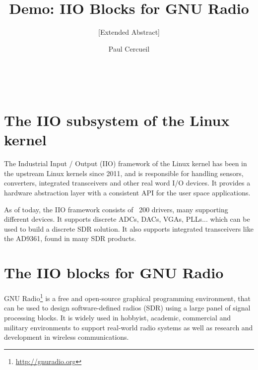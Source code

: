 \documentclass{acm_proc_article-sp}
\begin{document}
\title{Demo: IIO Blocks for GNU Radio}
\subtitle{[Extended Abstract]}


\author{
\alignauthor
Paul Cercueil\\
	\\
	\\
	\\
}

\maketitle



\section{The IIO subsystem of the Linux kernel}

The Industrial Input / Output (IIO) framework of the Linux kernel has been in
the upstream Linux kernels since 2011, and is responsible for handling sensors,
converters, integrated transceivers and other real word I/O devices. It provides
a hardware abstraction layer with a consistent API for the user space
applications.

As of today, the IIO framework consists of ~200 drivers, many supporting
different devices. It supports discrete ADCs, DACs, VGAs, PLLs... which
can be used to build a discrete SDR solution. It also supports integrated
transceivers like the AD9361, found in many SDR products.

\section{The IIO blocks for GNU Radio}

GNU Radio\footnote{\url{http://gnuradio.org}}
is a free and open-source graphical programming environment, that can
be used to design software-defined radios (SDR) using a large panel of signal
processing blocks. It is widely used in hobbyist, academic, commercial and
military environments to support real-world radio systems as well as research
and development in wireless communications.
\end{document}
